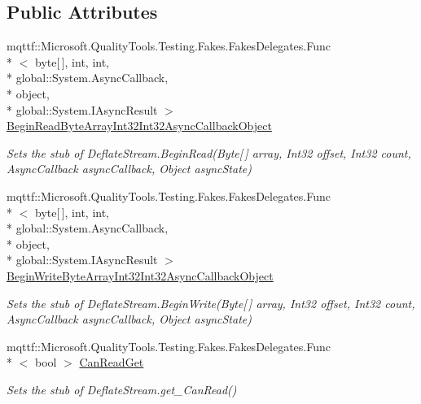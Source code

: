 \subsection*{Public Attributes}
\begin{DoxyCompactItemize}
\item 
mqttf\-::\-Microsoft.\-Quality\-Tools.\-Testing.\-Fakes.\-Fakes\-Delegates.\-Func\\*
$<$ byte\mbox{[}$\,$\mbox{]}, int, int, \\*
global\-::\-System.\-Async\-Callback, \\*
object, \\*
global\-::\-System.\-I\-Async\-Result $>$ \hyperlink{class_system_1_1_i_o_1_1_compression_1_1_fakes_1_1_stub_deflate_stream_a3394981c5e7bbae9929f5d3a62eb335c}{Begin\-Read\-Byte\-Array\-Int32\-Int32\-Async\-Callback\-Object}
\begin{DoxyCompactList}\small\item\em Sets the stub of Deflate\-Stream.\-Begin\-Read(\-Byte\mbox{[}$\,$\mbox{]} array, Int32 offset, Int32 count, Async\-Callback async\-Callback, Object async\-State)\end{DoxyCompactList}\item 
mqttf\-::\-Microsoft.\-Quality\-Tools.\-Testing.\-Fakes.\-Fakes\-Delegates.\-Func\\*
$<$ byte\mbox{[}$\,$\mbox{]}, int, int, \\*
global\-::\-System.\-Async\-Callback, \\*
object, \\*
global\-::\-System.\-I\-Async\-Result $>$ \hyperlink{class_system_1_1_i_o_1_1_compression_1_1_fakes_1_1_stub_deflate_stream_a3cfd6975d2b4400fabbf25133f2c56cf}{Begin\-Write\-Byte\-Array\-Int32\-Int32\-Async\-Callback\-Object}
\begin{DoxyCompactList}\small\item\em Sets the stub of Deflate\-Stream.\-Begin\-Write(\-Byte\mbox{[}$\,$\mbox{]} array, Int32 offset, Int32 count, Async\-Callback async\-Callback, Object async\-State)\end{DoxyCompactList}\item 
mqttf\-::\-Microsoft.\-Quality\-Tools.\-Testing.\-Fakes.\-Fakes\-Delegates.\-Func\\*
$<$ bool $>$ \hyperlink{class_system_1_1_i_o_1_1_compression_1_1_fakes_1_1_stub_deflate_stream_a57c9bdd3b54b63f5840b4586d97ea88e}{Can\-Read\-Get}
\begin{DoxyCompactList}\small\item\em Sets the stub of Deflate\-Stream.\-get\-\_\-\-Can\-Read()\end{DoxyCompactList}\item 

\end{DoxyCompactItemize}
